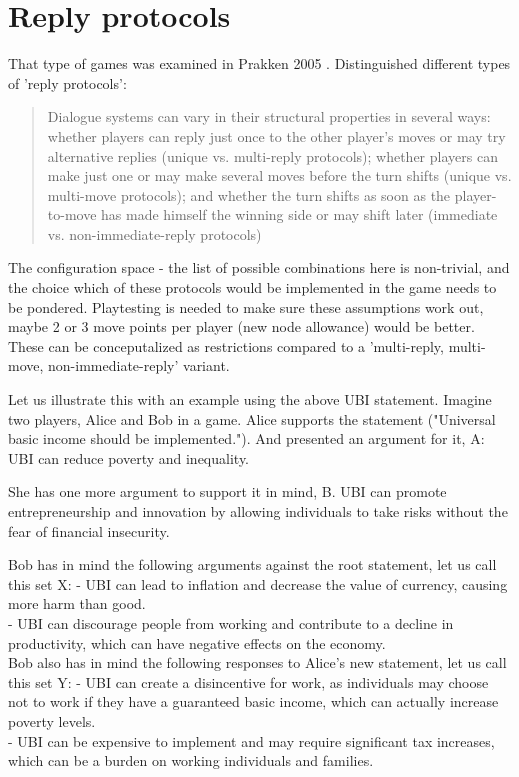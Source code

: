 \documentclass{report}
\begin{document}
{\section{Reply protocols}
That type of games was examined in Prakken 2005 \cite{prakken_coherence_2005}. Distinguished different types of 'reply protocols':
\begin{quotation}
  Dialogue systems can vary in their structural properties
in several ways: whether players can reply just once to the other player’s moves or may try
alternative replies (unique vs. multi-reply protocols); whether players can make just one or may
make several moves before the turn shifts (unique vs. multi-move protocols); and whether the turn
shifts as soon as the player-to-move has made himself the winning side or may shift later (immediate
vs. non-immediate-reply protocols)
\end{quotation}
\cite[page 1010]{prakken_coherence_2005}

The configuration space - the list of possible combinations here is non-trivial, and the choice which of these protocols would be implemented in the game needs to be pondered.
Playtesting is needed to make sure these assumptions work out, maybe 2 or 3 move points per player (new node allowance) would be better.
These can be conceputalized as restrictions compared to a 'multi-reply, multi-move, non-immediate-reply' variant.

Let us illustrate this with an example using the above UBI statement. Imagine two players, Alice and Bob in a game.
Alice supports the statement ("Universal basic income should be implemented."). And presented an argument for it, A:
UBI can reduce poverty and inequality.

She has one more argument to support it in mind, B.
UBI can promote entrepreneurship and innovation by allowing individuals to take risks without the fear of financial insecurity.

Bob has in mind the following arguments against the root statement, let us call this set X:
- UBI can lead to inflation and decrease the value of currency, causing more harm than good. \\
- UBI can discourage people from working and contribute to a decline in productivity, which can have  negative effects on the economy.\\

Bob also has in mind the following responses to Alice's new statement, let us call this set Y:
- UBI can create a disincentive for work, as individuals may choose not to work if they have a guaranteed basic income, which can actually increase poverty levels. \\
- UBI can be expensive to implement and may require significant tax increases, which can be a burden on working individuals and families. \\

}
\end{document}
